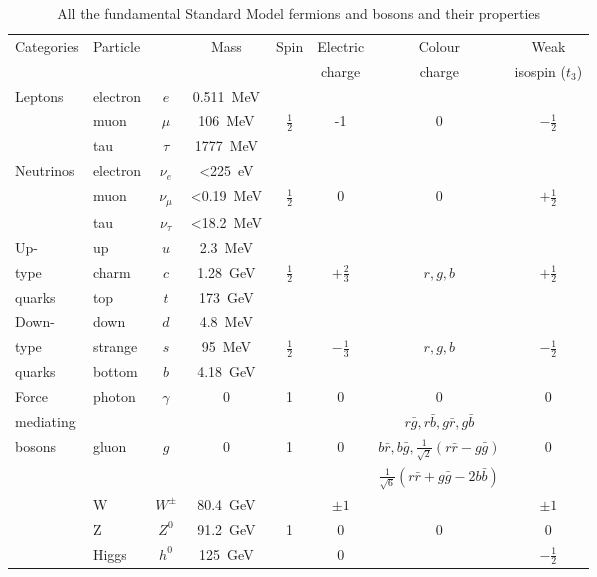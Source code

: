 \begin{table}
\begin{tabular}{l|l c|c|c|c|c|c}
Categories & Particle & & Mass & Spin & Electric & Colour & Weak \\
 &  & & & & charge & charge & isospin ($t_3$)\\
\hline
\hline
Leptons & electron & $e$ & 0.511~MeV & & & & \\
                & muon & $\mu$ & 106~MeV & $\frac{1}{2}$ & -1  & 0 &  $-\frac{1}{2}$\\
                & tau & $\tau$ & 1777~MeV  & &   &  &  \\
\hline
Neutrinos & electron & $\nu_e$ & <225~eV & & & & \\
                & muon & $\nu_{\mu}$ & <0.19~MeV & $\frac{1}{2}$  & 0  & 0 &  $+\frac{1}{2}$\\
                & tau & $\nu_{\tau}$ & <18.2~MeV &  &   &  &  \\
\hline
Up- & up & $u$ & 2.3~MeV & & & \\
type      & charm & $c$ & 1.28~GeV & $\frac{1}{2}$ & $+\frac{2}{3}$  & $r,g,b$ &  $+\frac{1}{2}$\\
quarks          & top & $t$ & 173~GeV  &   &  &  \\
\hline
Down-  & down & $d$ & 4.8~MeV & & & & \\
type & strange & $s$ & 95~MeV & $\frac{1}{2}$ & $-\frac{1}{3}$  & $r,g,b$ &  $-\frac{1}{2}$\\
quarks            & bottom & $b$ & 4.18~GeV &  &   &  &  \\
\hline
Force & photon & $\gamma$ & 0 & 1 & 0 & 0 & 0 \\
\cline{2-8}
 mediating &  &  &  &  &  & $r\bar{g},r\bar{b},g\bar{r},g\bar{b}$\\
 bosons & gluon & $g$ & 0 & 1 & 0 & $b\bar{r},b\bar{g},
\frac{1}{\sqrt{2}}(r\bar{r}-g\bar{g})$ & 0 \\
 & &  &  &  &  & $\frac{1}{\sqrt{6}}(r\bar{r}+g\bar{g}-2b\bar{b})$ &  \\
\cline{2-8}
 & W & $W^{\pm}$ & 80.4~GeV &  & $\pm 1$ &  & $\pm 1$ \\
 & Z & $Z^0$ & 91.2~GeV & 1 & 0 & 0 & 0 \\
 & Higgs & $h^0$ & 125~GeV &  & 0 &  & $-\frac{1}{2}$ \\
\end{tabular}
\caption{All the fundamental Standard Model fermions and bosons and
their properties \cite{PhysRevD.86.010001}}
\label{tab:smParticles}
\end{table}

